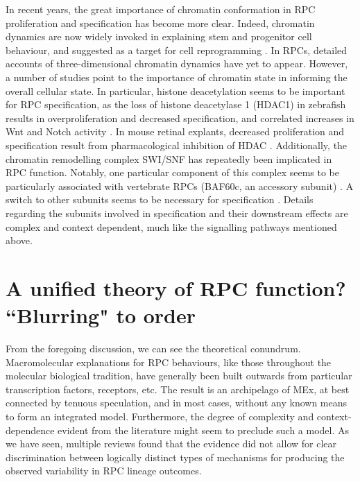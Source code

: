 \documentclass{ut-thesis}
\begin{document}
\begin{NoHyper}
In recent years, the great importance of chromatin conformation in RPC proliferation and specification has become more clear. Indeed, chromatin dynamics are now widely invoked in explaining stem and progenitor cell behaviour, and suggested as a target for cell reprogramming \cite{Kondo2006,Tee2014}. In RPCs, detailed accounts of three-dimensional chromatin dynamics have yet to appear. However, a number of studies point to the importance of chromatin state in informing the overall cellular state. In particular, histone deacetylation seems to be important for RPC specification, as the loss of histone deacetylase 1 (HDAC1) in zebrafish results in overproliferation and decreased specification, and correlated increases in Wnt and Notch activity \cite{Yamaguchi2005}. In mouse retinal explants, decreased proliferation and specification result from  pharmacological inhibition of HDAC \cite{Chen2007}. Additionally, the chromatin remodelling complex SWI/SNF has repeatedly been implicated in RPC function. Notably, one particular component of this complex seems to be particularly associated with vertebrate RPCs (BAF60c, an accessory subunit) \cite{Lamba2008}. A switch to other subunits seems to be necessary for specification \cite{Lessard2007}. Details regarding the subunits involved in specification and their downstream effects are complex and context dependent, much like the signalling pathways mentioned above.

\section{A unified theory of RPC function? ``Blurring" to order}

From the foregoing discussion, we can see the theoretical conundrum. Macromolecular explanations for RPC behaviours, like those throughout the molecular biological tradition, have generally been built outwards from particular transcription factors, receptors, etc. The result is an archipelago of MEx, at best connected by tenuous speculation, and in most cases, without any known means to form an integrated model. Furthermore, the degree of complexity and context-dependence evident from the literature might seem to preclude such a model. As we have seen, multiple reviews found that the evidence did not allow for clear discrimination between logically distinct types of mechanisms for producing the observed variability in RPC lineage outcomes.


\end{NoHyper}
\end{document}
